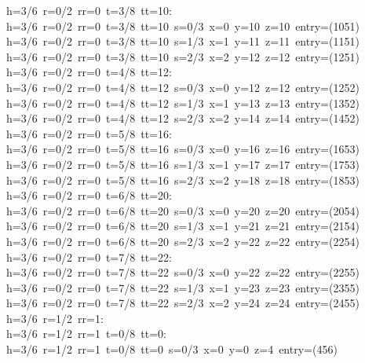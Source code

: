 \begin{tabbing}
h=3/6\ r=0/2\ rr=0\ t=3/8\ tt=10:\\[0pt]
h=3/6\ r=0/2\ rr=0\ t=3/8\ tt=10\ s=0/3\ x=0\ y=10\ z=10\ entry=(1051)\\[0pt]
h=3/6\ r=0/2\ rr=0\ t=3/8\ tt=10\ s=1/3\ x=1\ y=11\ z=11\ entry=(1151)\\[0pt]
h=3/6\ r=0/2\ rr=0\ t=3/8\ tt=10\ s=2/3\ x=2\ y=12\ z=12\ entry=(1251)\\[0pt]
h=3/6\ r=0/2\ rr=0\ t=4/8\ tt=12:\\[0pt]
h=3/6\ r=0/2\ rr=0\ t=4/8\ tt=12\ s=0/3\ x=0\ y=12\ z=12\ entry=(1252)\\[0pt]
h=3/6\ r=0/2\ rr=0\ t=4/8\ tt=12\ s=1/3\ x=1\ y=13\ z=13\ entry=(1352)\\[0pt]
h=3/6\ r=0/2\ rr=0\ t=4/8\ tt=12\ s=2/3\ x=2\ y=14\ z=14\ entry=(1452)\\[0pt]
h=3/6\ r=0/2\ rr=0\ t=5/8\ tt=16:\\[0pt]
h=3/6\ r=0/2\ rr=0\ t=5/8\ tt=16\ s=0/3\ x=0\ y=16\ z=16\ entry=(1653)\\[0pt]
h=3/6\ r=0/2\ rr=0\ t=5/8\ tt=16\ s=1/3\ x=1\ y=17\ z=17\ entry=(1753)\\[0pt]
h=3/6\ r=0/2\ rr=0\ t=5/8\ tt=16\ s=2/3\ x=2\ y=18\ z=18\ entry=(1853)\\[0pt]
h=3/6\ r=0/2\ rr=0\ t=6/8\ tt=20:\\[0pt]
h=3/6\ r=0/2\ rr=0\ t=6/8\ tt=20\ s=0/3\ x=0\ y=20\ z=20\ entry=(2054)\\[0pt]
h=3/6\ r=0/2\ rr=0\ t=6/8\ tt=20\ s=1/3\ x=1\ y=21\ z=21\ entry=(2154)\\[0pt]
h=3/6\ r=0/2\ rr=0\ t=6/8\ tt=20\ s=2/3\ x=2\ y=22\ z=22\ entry=(2254)\\[0pt]
h=3/6\ r=0/2\ rr=0\ t=7/8\ tt=22:\\[0pt]
h=3/6\ r=0/2\ rr=0\ t=7/8\ tt=22\ s=0/3\ x=0\ y=22\ z=22\ entry=(2255)\\[0pt]
h=3/6\ r=0/2\ rr=0\ t=7/8\ tt=22\ s=1/3\ x=1\ y=23\ z=23\ entry=(2355)\\[0pt]
h=3/6\ r=0/2\ rr=0\ t=7/8\ tt=22\ s=2/3\ x=2\ y=24\ z=24\ entry=(2455)\\[0pt]
h=3/6\ r=1/2\ rr=1:\\[0pt]
h=3/6\ r=1/2\ rr=1\ t=0/8\ tt=0:\\[0pt]
h=3/6\ r=1/2\ rr=1\ t=0/8\ tt=0\ s=0/3\ x=0\ y=0\ z=4\ entry=(456)\\[0pt]

\end{tabbing}
